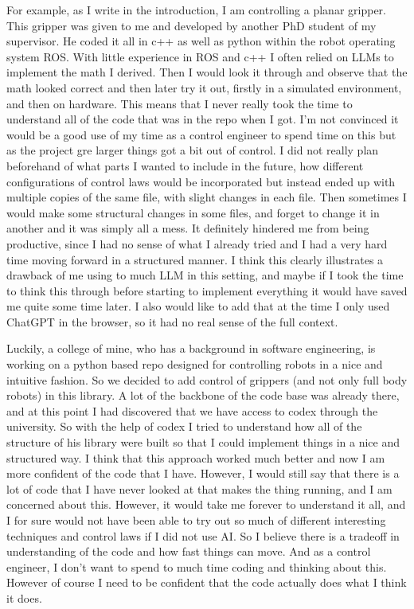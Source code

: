 \documentclass[11pt]{article}
\begin{document}
For example, as I write in the introduction, I am controlling a planar gripper. This gripper was given to me and developed by another PhD student of my supervisor. He coded it all in c++ as well as python within the robot operating system ROS. With little experience in ROS and c++ I often relied on LLMs to implement the math I derived. Then I would look it through and observe that the math looked correct and then later try it out, firstly in a simulated environment, and then on hardware. This means that I never really took the time to understand all of the code that was in the repo when I got. I'm not convinced it would be a good use of my time as a control engineer to spend time on this but as the project gre larger things got a bit out of control. I did not really plan beforehand of what parts I wanted to include in the future, how different configurations of control laws would be incorporated but instead ended up with multiple copies of the same file, with slight changes in each file. Then sometimes I would make some structural changes in some files, and forget to change it in another and it was simply all a mess. It definitely hindered me from being productive, since I had no sense of what I already tried and I had a very hard time moving forward in a structured manner. I think this clearly illustrates a drawback of me using to much LLM in this setting, and maybe if I took the time to think this through before starting to implement everything it would have saved me quite some time later. I also would like to add that at the time I only used ChatGPT in the browser, so it had no real sense of the full context.

Luckily, a college of mine, who has a background in software engineering, is working on a python based repo designed for controlling robots in a nice and intuitive fashion. So we decided to add control of grippers (and not only full body robots) in this library. A lot of the backbone of the code base was already there, and at this point I had discovered that we have access to codex through the university. So with the help of codex I tried to understand how all of the structure of his library were built so that I could implement things in a nice and structured way. I think that this approach worked much better and now I am more confident of the code that I have. However, I would still say that there is a lot of code that I have never looked at that makes the thing running, and I am concerned about this. However, it would take me forever to understand it all, and I for sure would not have been able to try out so much of different interesting techniques and control laws if I did not use AI. So I believe there is a tradeoff in understanding of the code and how fast things can move. And as a control engineer, I don't want to spend to much time coding and thinking about this. However of course I need to be confident that the code actually does what I think it does. 
\end{document}
